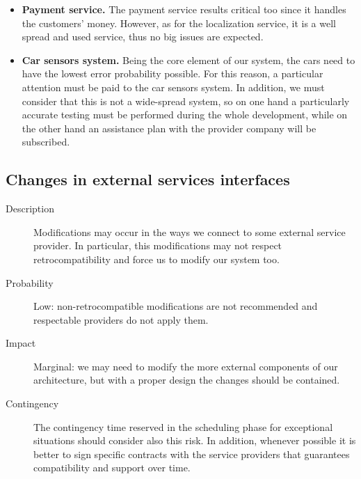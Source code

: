 \begin{description}
\begin{itemize}
				\item \textbf{Payment service.} The payment service results critical too since it handles the customers' money. However, as for the localization service, it is a well spread and used service, thus no big issues are expected.
				\item \textbf{Car sensors system.} Being the core element of our system, the cars need to have the lowest error probability possible. For this reason, a particular attention must be paid to the car sensors system. In addition, we must consider that this is not a wide-spread system, so on one hand a particularly accurate testing must be performed during the whole development, while on the other hand an assistance plan with the provider company will be subscribed.
			\end{itemize}
	\end{description}

\subsection*{Changes in external services interfaces}
	\begin{description}
		\item[Description] Modifications may occur in the ways we connect to some external service provider. In particular, this modifications may not respect retrocompatibility and force us to modify our system too.
		\item[Probability] Low: non-retrocompatible modifications are not recommended and respectable providers do not apply them.
		\item[Impact] Marginal: we may need to modify the more external components of our architecture, but with a proper design the changes should be contained.
		\item[Contingency] The contingency time reserved in the scheduling phase for exceptional situations should consider also this risk. In addition, whenever possible it is better to sign specific contracts with the service providers that guarantees compatibility and support over time.
	\end{description}

